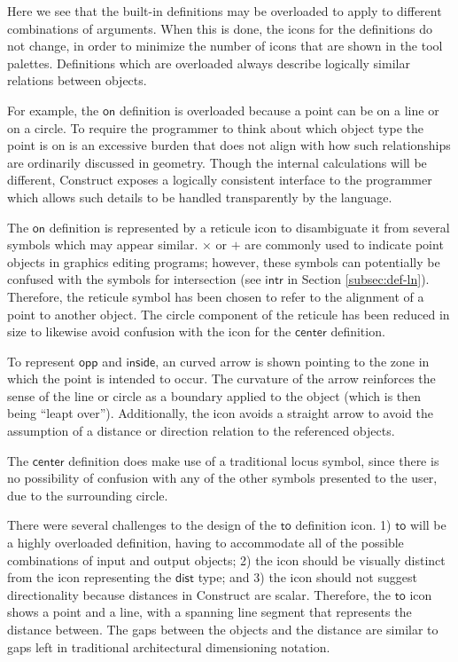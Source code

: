 \documentclass[twoside,openright,11pt]{report}
\begin{document}
Here we see that the built-in definitions may be overloaded to apply to different combinations of arguments. 
When this is done, the icons for the definitions do not change, in order to minimize the number of icons that are shown in the tool palettes. 
Definitions which are overloaded always describe logically similar relations between objects.

For example, the $\mathsf{on}$ definition is overloaded because a point can be on a line or on a circle. 
To require the programmer to think about which object type the point is on is an excessive burden that does not align with how such relationships are ordinarily discussed in geometry. 
Though the internal calculations will be different, Construct exposes a logically consistent interface to the programmer which allows such details to be handled transparently by the language.

The $\mathsf{on}$ definition is represented by a reticule icon to disambiguate it from several symbols which may appear similar. 
$\times$ or $+$ are commonly used to indicate point objects in graphics editing programs; however, these symbols can potentially be confused with the symbols for intersection (see $\mathsf{intr}$ in Section \ref{subsec:def-ln}). 
Therefore, the reticule symbol has been chosen to refer to the alignment of a point to another object. 
The circle component of the reticule has been reduced in size to likewise avoid confusion with the icon for the $\mathsf{center}$ definition.

To represent $\mathsf{opp}$ and $\mathsf{inside}$, an curved arrow is shown pointing to the zone in which the point is intended to occur. 
The curvature of the arrow reinforces the sense of the line or circle as a boundary applied to the object (which is then being ``leapt over'').
Additionally, the icon avoids a straight arrow to avoid the assumption of a distance or direction relation to the referenced objects.

The $\mathsf{center}$ definition does make use of a traditional locus symbol, since there is no possibility of confusion with any of the other symbols presented to the user, due to the surrounding circle.

There were several challenges to the design of the $\mathsf{to}$ definition icon. 
1) $\mathsf{to}$ will be a highly overloaded definition, having to accommodate all of the possible combinations of input and output objects; 2) the icon should be visually distinct from the icon representing the $\mathsf{dist}$ type; and 3) the icon should not suggest directionality because distances in Construct are scalar.
Therefore, the $\mathsf{to}$ icon shows a point and a line, with a spanning line segment that represents the distance between. 
The gaps between the objects and the distance are similar to gaps left in traditional architectural dimensioning notation.
\end{document}
